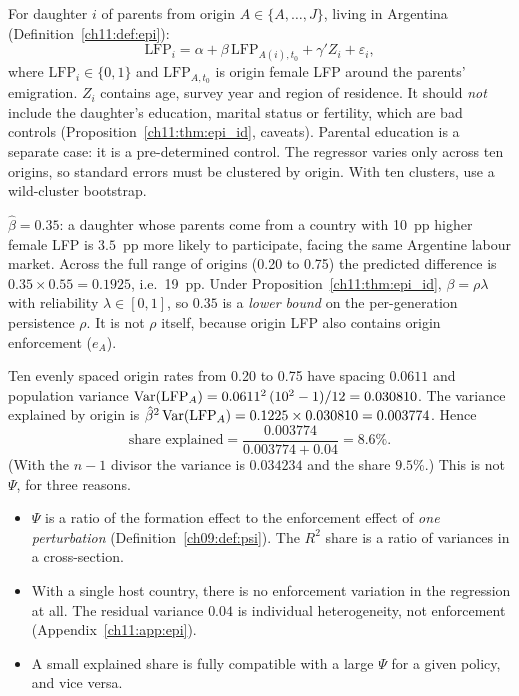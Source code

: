 \documentclass[../solutions_manual.tex]{subfiles}
\begin{document}
 For daughter $i$ of parents from origin $A \in \{A, \ldots, J\}$, living in Argentina (Definition~\ref{ch11:def:epi}):
\[
\text{LFP}_{i} = \alpha + \beta\,\text{LFP}_{A(i),t_0} + \gamma'Z_i + \varepsilon_i ,
\]
where $\text{LFP}_i \in \{0,1\}$ and $\text{LFP}_{A,t_0}$ is origin female LFP around the parents' emigration. $Z_i$ contains age, survey year and region of residence. It should \emph{not} include the daughter's education, marital status or fertility, which are bad controls (Proposition~\ref{ch11:thm:epi_id}, caveats). Parental education is a separate case: it is a pre-determined control. The regressor varies only across ten origins, so standard errors must be clustered by origin. With ten clusters, use a wild-cluster bootstrap.

 $\hat\beta = 0.35$: a daughter whose parents come from a country with 10~pp higher female LFP is $3.5$~pp more likely to participate, facing the same Argentine labour market. Across the full range of origins (0.20 to 0.75) the predicted difference is $0.35\times 0.55 = 0.1925$, i.e.\ 19~pp. Under Proposition~\ref{ch11:thm:epi_id}, $\beta = \rho\lambda$ with reliability $\lambda \in [0,1]$, so $0.35$ is a \emph{lower bound} on the per-generation persistence $\rho$. It is not $\rho$ itself, because origin LFP also contains origin enforcement ($e_A$).

 Ten evenly spaced origin rates from 0.20 to 0.75 have spacing $0.0611$ and population variance $\operatorname{Var}(\text{LFP}_A) = 0.0611^2\,(10^2 - 1)/12 = 0.030810$. The variance explained by origin is $\hat\beta^2\operatorname{Var}(\text{LFP}_A) = 0.1225\times 0.030810 = 0.003774$. Hence
\[
\text{share explained} = \frac{0.003774}{0.003774 + 0.04} = 8.6\% .
\]
(With the $n-1$ divisor the variance is $0.034234$ and the share $9.5\%$.) This is not $\Psi$, for three reasons.
\begin{itemize}
\item $\Psi$ is a ratio of the formation effect to the enforcement effect of \emph{one perturbation} (Definition~\ref{ch09:def:psi}). The $R^2$ share is a ratio of variances in a cross-section.
\item With a single host country, there is no enforcement variation in the regression at all. The residual variance $0.04$ is individual heterogeneity, not enforcement (Appendix~\ref{ch11:app:epi}).
\item A small explained share is fully compatible with a large $\Psi$ for a given policy, and vice versa.
\end{itemize}
\end{document}
